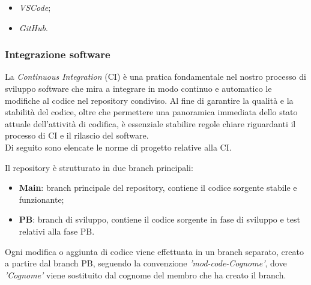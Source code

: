\documentclass[10pt, a4paper]{article}
\begin{document}
\begin{itemize}
    \item \textit{VSCode};
    \item \textit{GitHub}.
\end{itemize}


\subsubsection{Integrazione software}
La \textit{Continuous Integration\pg} (CI) è una pratica fondamentale nel nostro processo di sviluppo software che mira a integrare in modo continuo e automatico le 
modifiche al codice nel repository condiviso. Al fine di garantire la qualità e la stabilità del codice, oltre che permettere una panoramica immediata dello stato 
attuale dell'attività di codifica, è essenziale stabilire regole chiare riguardanti il processo di CI e il rilascio del software.\\ 
Di seguito sono elencate le norme di progetto relative alla CI.

Il repository è strutturato in due branch principali:
\begin{itemize}
    \item \textbf{Main}: branch principale del repository, contiene il codice sorgente stabile e funzionante;
    \item \textbf{PB}: branch di sviluppo, contiene il codice sorgente in fase di sviluppo e test relativi alla fase PB.
\end{itemize}
Ogni modifica o aggiunta di codice viene effettuata in un branch separato, creato a partire dal branch PB, seguendo la convenzione 
\textit{'mod-code-Cognome'}, dove \textit{'Cognome'} viene sostituito dal cognome del membro che ha creato il branch.
\end{document}
